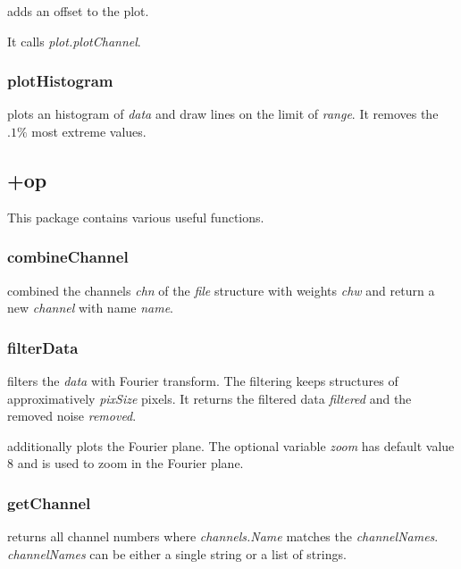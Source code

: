  adds an offset to the plot.
\edf

It calls \emph{plot.plotChannel}. 
\subsubsection{plotHistogram}
\bdf
{} plots an histogram of \emph{data} and draw lines on the limit of \emph{range}. It removes the $.1\%$ most extreme values. 
\edf

\subsection{+op}
This package contains various useful functions.
\subsubsection{combineChannel}
\bdf
{} combined the channels \emph{chn} of the \emph{file} structure with weights \emph{chw} and return a new \emph{channel} with name \emph{name}.
\edf
\subsubsection{filterData}
\bdf
{} filters the \emph{data} with Fourier transform. The filtering keeps structures of approximatively \emph{pixSize} pixels. It returns the filtered data \emph{filtered} and the removed noise \emph{removed}.

 additionally plots the Fourier plane. The optional variable \emph{zoom} has default value $8$ and is used to zoom in the Fourier plane.
\edf
\subsubsection{getChannel}
\bdf
{} returns all channel numbers where \emph{channels.Name} matches the \emph{channelNames}. \emph{channelNames} can be either a single string or a list of strings.

